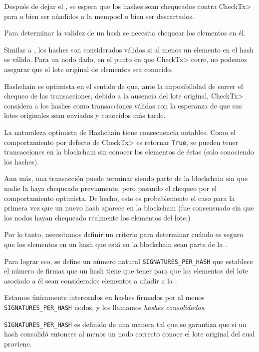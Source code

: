 Después de dejar el \collector, se espera que los hashes sean chequeados contra \<CheckTx>
para o bien ser añadidos a la mempool o bien ser descartados.

%
Para determinar la validez de un hash se necesita chequear los elementos en él.

%
Similar a \compresschain, los hashes son considerados válidos si al menos un elemento
en el hash es válido.
%
Para un nodo dado, en el punto en que \<CheckTx> corre, no podemos asegurar que el
lote original de elementos sea conocido.

%
Hashchain es optimista en el sentido de que, ante la imposibilidad de correr el chequeo
de las transacciones, debido a la ausencia del lote original, \<CheckTx> considera a los
hashes como transacciones válidas con la esperanza de que sus lotes originales sean enviados
y conocidos más tarde. 

%
La naturaleza optimista de Hashchain tiene consecuencia notables.
%
Como el comportamiento por defecto de  \<CheckTx> es retornar \texttt{True},
se pueden tener transacciones en la blockchain sin conocer los elementos de éstas
(solo conociendo los hashes).

%
Aun más, una transacción puede terminar siendo parte de la blockchain sin que nadie
la haya chequeado previamente, pero pasando el chequeo por el comportamiento optimista.
%
De hecho, este es probablemente el caso para la primera vez que un nuevo hash aparece
en la blockchain (fue consensuado sin que los nodos hayan chequeado realmente los elementos
del lote.)

%

Por lo tanto, necesitamos definir un criterio para determinar cuándo es seguro
que los elementos en un hash que está en la blockchain sean parte de la \setchain.

%
Para lograr eso, se define un número natural \texttt{SIGNATURES\_PER\_HASH} que establece
el número de firmas que un hash tiene que tener para que los elementos del lote asociado a él
sean considerados elementos a añadir a la \setchain.

%
Estamos únicamente interesados en hashes firmados por al menos \texttt{SIGNATURES\_PER\_HASH}
nodos, y los llamamos \textit{hashes consolidados}.

\texttt{SIGNATURES\_PER\_HASH} es definido de una manera tal que se garantiza que si un hash
consolidó entonces al menos un nodo correcto conoce el lote original del cual proviene.

